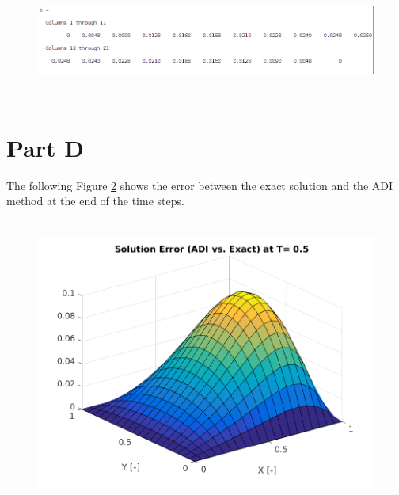 \documentclass[12pt]{article}
\begin{document}
	\begin{figure}[H]
		\centering
		\includegraphics[height=1.5in]{b_mat_2.png}
		\label{fig:bmat2}
	\end{figure}
		
	\newpage		
	\section{Part D}
	
	\noindent The following Figure \ref{fig:error} shows the error between the exact solution and the ADI method at the end of the time steps.
	
	\begin{figure}[H]
		\centering
		\includegraphics[height=3.75in]{solution_error.png}
		\label{fig:error}
	\end{figure}	
	
	
	
	
	
\end{document}
